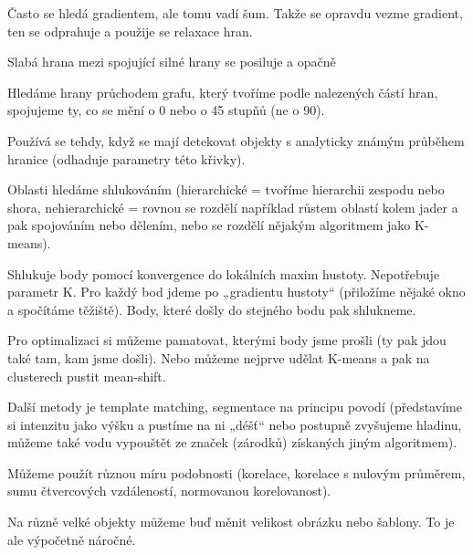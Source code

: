 \documentclass[12pt]{article}					%
\begin{document}
\begin{definice}[Hranice]
	Často se hledá gradientem, ale tomu vadí šum. Takže se opravdu vezme gradient, ten se odprahuje a použije se relaxace hran.
\end{definice}

\begin{definice}
	Slabá hrana mezi spojující silné hrany se posiluje a opačně
\end{definice}

\begin{definice}
	Hledáme hrany průchodem grafu, který tvoříme podle nalezených částí hran, spojujeme ty, co se mění o 0 nebo o 45 stupňů (ne o 90).
\end{definice}

\begin{definice}
	Používá se tehdy, když se mají detekovat objekty s analyticky známým průběhem hranice (odhaduje parametry této křivky).
\end{definice}

\begin{definice}[Oblast]
	Oblasti hledáme shlukováním (hierarchické = tvoříme hierarchii zespodu nebo shora, nehierarchické = rovnou se rozdělí například růstem oblastí kolem jader a pak spojováním nebo dělením, nebo se rozdělí nějakým algoritmem jako K-means).
\end{definice}


\begin{definice}
	Shlukuje body pomocí konvergence do lokálních maxim hustoty. Nepotřebuje parametr K. Pro každý bod jdeme po „gradientu hustoty“ (přiložíme nějaké okno a spočítáme těžiště). Body, které došly do stejného bodu pak shlukneme.

	Pro optimalizaci si můžeme pamatovat, kterými body jsme prošli (ty pak jdou také tam, kam jsme došli). Nebo můžeme nejprve udělat K-means a pak na clusterech pustit mean-shift.
\end{definice}

\begin{poznamka}
	Další metody je template matching, segmentace na principu povodí (představíme si intenzitu jako výšku a pustíme na ni „déšť“ nebo postupně zvyšujeme hladinu, můžeme také vodu vypouštět ze značek (zárodků) získaných jiným algoritmem).
\end{poznamka}

\begin{definice}
	Můžeme použít různou míru podobnosti (korelace, korelace s nulovým průměrem, sumu čtvercových vzdáleností, normovanou korelovanost).

	Na různě velké objekty můžeme buď měnit velikost obrázku nebo šablony. To je ale výpočetně náročné.
\end{definice}
\end{document}
